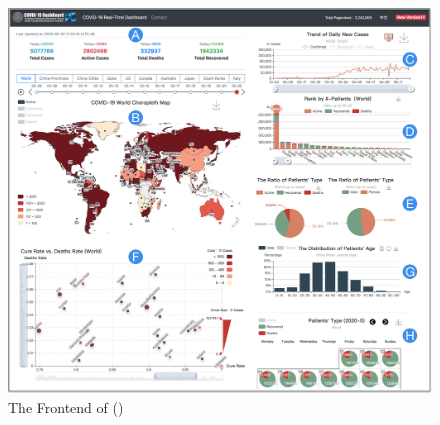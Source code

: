


\begin{figure}[t!]
	\centering
	\includegraphics[width=.95\columnwidth]{figs/frontend.pdf}
	\vspace{-1em}
	\caption{The Frontend of \sys ()}
	\label{fig:frontend}
	\vspace{-1em}
\end{figure}


